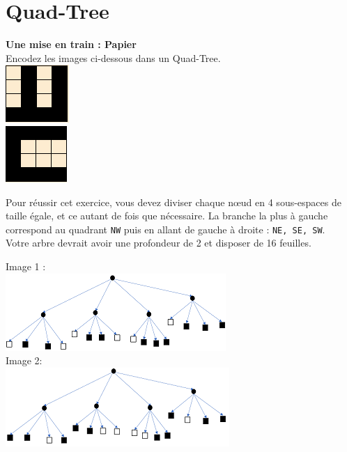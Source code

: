 \newpage

\section{Quad-Tree}
\begin{Exercice}[10 minutes]\textbf{Une mise en train : Papier}\\

Encodez les images ci-dessous dans un Quad-Tree.\\

\includegraphics[]{Quad-Tree 1.PNG}\\
\includegraphics[]{Quad-Tree 2.PNG}

\begin{conseil}
    Pour réussir cet exercice, vous devez diviser chaque nœud en 4 sous-espaces de taille égale, et ce autant de fois que nécessaire. La branche la plus à gauche correspond au quadrant \lstinline{NW} puis en allant de gauche à droite : \lstinline{NE, SE, SW}.\\
    
    Votre arbre devrait avoir une profondeur de 2 et disposer de 16 feuilles.
\end{conseil}
\begin{solution}
Image 1 :\\
    \includegraphics[]{Quad-Tree1Solution.PNG}\\
    
Image 2: \\
    \includegraphics[]{Quad-Tree2Solution.PNG}
\end{solution}
\end{Exercice}
